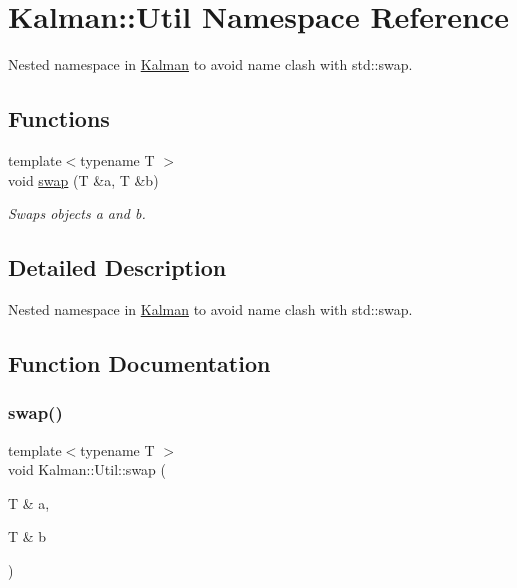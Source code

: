 \hypertarget{namespaceKalman_1_1Util}{}\section{Kalman\+:\+:Util Namespace Reference}
\label{namespaceKalman_1_1Util}


Nested namespace in {\ttfamily \mbox{\hyperlink{namespaceKalman}{Kalman}}} to avoid name clash with {\ttfamily std\+::swap}.  


\subsection*{Functions}
\begin{DoxyCompactItemize}
\item 
{\footnotesize template$<$typename T $>$ }\\void \mbox{\hyperlink{namespaceKalman_1_1Util_a7d858e9f60b84a69555431439ff6fcc2}{swap}} (T \&a, T \&b)
\begin{DoxyCompactList}\small\item\em Swaps objects {\ttfamily a} and {\ttfamily b}. \end{DoxyCompactList}\end{DoxyCompactItemize}


\subsection{Detailed Description}
Nested namespace in {\ttfamily \mbox{\hyperlink{namespaceKalman}{Kalman}}} to avoid name clash with {\ttfamily std\+::swap}. 

\subsection{Function Documentation}
\mbox{\label{namespaceKalman_1_1Util_a7d858e9f60b84a69555431439ff6fcc2}} 
\subsubsection{\texorpdfstring{swap()}{swap()}}
{\footnotesize\ttfamily template$<$typename T $>$ \\
void Kalman\+::\+Util\+::swap (\begin{DoxyParamCaption}\item[{T \&}]{a,  }\item[{T \&}]{b }\end{DoxyParamCaption})\hspace{0.3cm}{\ttfamily [inline]}}



